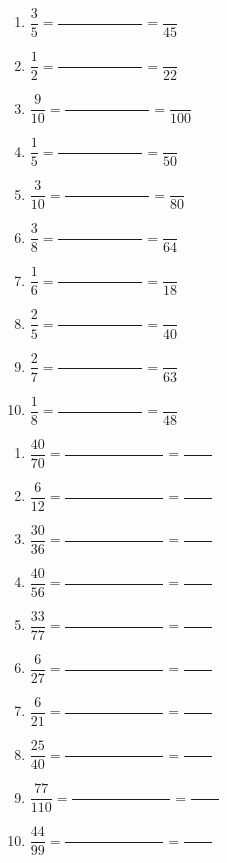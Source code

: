 \documentclass[a4paper,11pt,fleqn]{article}
\begin{document}
\newpage
{}

\begin{multicols}{2}
\begin{enumerate}[itemsep=2em]
	\item $ \dfrac{3}{5} = \dfrac{\phantom{000000000000}}{\phantom{000000000000}} = \dfrac{}{45} $
	\item $ \dfrac{1}{2} = \dfrac{\phantom{000000000000}}{\phantom{000000000000}} = \dfrac{}{22} $
	\item $ \dfrac{9}{10} = \dfrac{\phantom{000000000000}}{\phantom{000000000000}} = \dfrac{}{100} $
	\item $ \dfrac{1}{5} = \dfrac{\phantom{000000000000}}{\phantom{000000000000}} = \dfrac{}{50} $
	\item $ \dfrac{3}{10} = \dfrac{\phantom{000000000000}}{\phantom{000000000000}} = \dfrac{}{80} $
	\item $ \dfrac{3}{8} = \dfrac{\phantom{000000000000}}{\phantom{000000000000}} = \dfrac{}{64} $
	\item $ \dfrac{1}{6} = \dfrac{\phantom{000000000000}}{\phantom{000000000000}} = \dfrac{}{18} $
	\item $ \dfrac{2}{5} = \dfrac{\phantom{000000000000}}{\phantom{000000000000}} = \dfrac{}{40} $
	\item $ \dfrac{2}{7} = \dfrac{\phantom{000000000000}}{\phantom{000000000000}} = \dfrac{}{63} $
	\item $ \dfrac{1}{8} = \dfrac{\phantom{000000000000}}{\phantom{000000000000}} = \dfrac{}{48} $
\end{enumerate}
\end{multicols}


\begin{multicols}{2}
\begin{enumerate}[itemsep=2em]
	\item $ \dfrac{40}{70} = \dfrac{\phantom{00000000000000}}{} = \dfrac{\phantom{0000}}{} $
	\item $ \dfrac{6}{12} = \dfrac{\phantom{00000000000000}}{} = \dfrac{\phantom{0000}}{} $
	\item $ \dfrac{30}{36} = \dfrac{\phantom{00000000000000}}{} = \dfrac{\phantom{0000}}{} $
	\item $ \dfrac{40}{56} = \dfrac{\phantom{00000000000000}}{} = \dfrac{\phantom{0000}}{} $
	\item $ \dfrac{33}{77} = \dfrac{\phantom{00000000000000}}{} = \dfrac{\phantom{0000}}{} $
	\item $ \dfrac{6}{27} = \dfrac{\phantom{00000000000000}}{} = \dfrac{\phantom{0000}}{} $
	\item $ \dfrac{6}{21} = \dfrac{\phantom{00000000000000}}{} = \dfrac{\phantom{0000}}{} $
	\item $ \dfrac{25}{40} = \dfrac{\phantom{00000000000000}}{} = \dfrac{\phantom{0000}}{} $
	\item $ \dfrac{77}{110} = \dfrac{\phantom{00000000000000}}{} = \dfrac{\phantom{0000}}{} $
	\item $ \dfrac{44}{99} = \dfrac{\phantom{00000000000000}}{} = \dfrac{\phantom{0000}}{} $
\end{enumerate}
\end{multicols}
\end{document}

